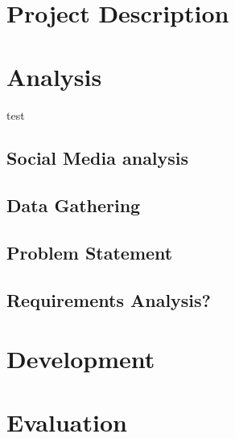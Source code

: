 \part*{Project Description}



\part{Analysis}
test

\chapter{Social Media analysis}\label{cha:SocialMediaAnalysis}






\chapter{Data Gathering}\label{cha:DataGathering}



\chapter{Problem Statement}


\chapter{Requirements Analysis?}


\part{Development}




%




\part{Evaluation}



